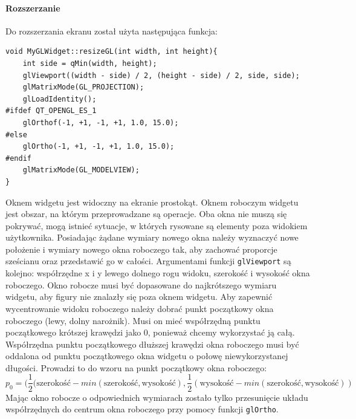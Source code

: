 \paragraph{Rozszerzanie}
Do rozszerzania ekranu został użyta następująca funkcja:
\begin{lstlisting}
void MyGLWidget::resizeGL(int width, int height){
    int side = qMin(width, height);
    glViewport((width - side) / 2, (height - side) / 2, side, side);
    glMatrixMode(GL_PROJECTION);
    glLoadIdentity();
#ifdef QT_OPENGL_ES_1
    glOrthof(-1, +1, -1, +1, 1.0, 15.0);
#else
    glOrtho(-1, +1, -1, +1, 1.0, 15.0);
#endif
    glMatrixMode(GL_MODELVIEW);
}
\end{lstlisting}
Oknem widgetu jest widoczny na ekranie prostokąt. Oknem roboczym widgetu jest obszar, na którym przeprowadzane są operacje. Oba okna nie muszą się pokrywać, mogą istnieć sytuacje, w których rysowane są elementy poza widokiem użytkownika. Posiadając żądane wymiary nowego okna należy wyznaczyć nowe położenie i wymiary nowego okna roboczego tak, aby zachować proporcje sześcianu oraz przedstawić go w całości. Argumentami funkcji \texttt{glViewport} są kolejno: współrzędne x i y lewego dolnego rogu widoku, szerokość i wysokość okna roboczego. Okno robocze musi być dopasowane do najkrótszego wymiaru widgetu, aby figury nie znalazły się poza oknem widgetu. Aby zapewnić wycentrowanie widoku roboczego należy dobrać punkt początkowy okna roboczego (lewy, dolny narożnik). Musi on mieć współrzędną punktu początkowego krótszej krawędzi jako 0, ponieważ chcemy wykorzystać ją całą. Współrzędna punktu początkowego dłuższej krawędzi okna roboczego musi być oddalona od punktu początkowego okna widgetu o połowę niewykorzystanej długości. Prowadzi to do wzoru na punkt początkowy okna roboczego: 
\begin{equation}
p_0=(\frac{1}{2}(\text{szerokość}-min(\text{szerokość}, \text{wysokość}),\frac{1}{2}(\text{wysokość}-min(\text{szerokość}, \text{wysokość}))
\end{equation}
Mając okno robocze o odpowiednich wymiarach zostało tylko przesunięcie układu współrzędnych do centrum okna roboczego przy pomocy funkcji \texttt{glOrtho}.
